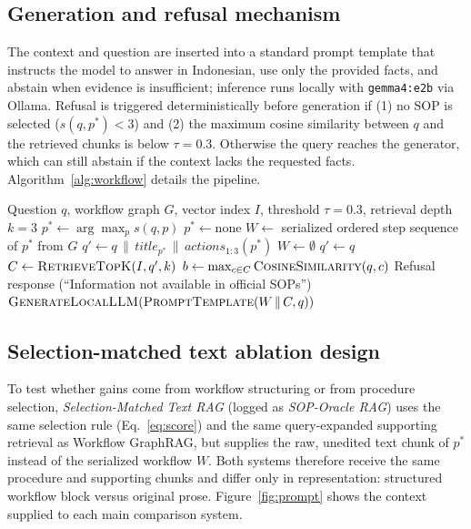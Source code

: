 \documentclass[preprint,10pt]{elsarticle}
\begin{document}
\subsection{Generation and refusal mechanism}
The context and question are inserted into a standard prompt template that instructs the model to answer in Indonesian, use only the provided facts, and abstain when evidence is insufficient; inference runs locally with \texttt{gemma4:e2b} via Ollama. Refusal is triggered deterministically before generation if (1) no SOP is selected ($s(q,p^\ast)<3$) and (2) the maximum cosine similarity between $q$ and the retrieved chunks is below $\tau=0.3$. Otherwise the query reaches the generator, which can still abstain if the context lacks the requested facts. Algorithm~\ref{alg:workflow} details the pipeline.

\begin{algorithm}[!htbp]
\caption{Execution pipeline of Process-Aware Workflow GraphRAG}
\label{alg:workflow}
\begin{algorithmic}[1]
\REQUIRE Question $q$, workflow graph $G$, vector index $I$, threshold $\tau = 0.3$, retrieval depth $k=3$
\STATE $p^\ast \leftarrow \arg\max_p s(q,p)$ 
  \STATE $p^\ast \leftarrow \text{none}$
\ENDIF
{}
  \STATE $W \leftarrow$ serialized ordered step sequence of $p^\ast$ from $G$
  \STATE $q' \leftarrow q \,\|\, \textit{title}_{p^\ast} \,\|\, \textit{actions}_{1:3}(p^\ast)$ 
\ELSE
  \STATE $W \leftarrow \emptyset$
  \STATE $q' \leftarrow q$ 
\ENDIF
\STATE $C \leftarrow \textsc{RetrieveTopK}(I, q', k)$
\STATE $b \leftarrow \max_{c \in C} \textsc{CosineSimilarity}(q, c)$
  \RETURN Refusal response (``Information not available in official SOPs'')
\ENDIF
\RETURN $\textsc{GenerateLocalLLM}(\textsc{PromptTemplate}(W \,\|\, C, q))$
\end{algorithmic}
\end{algorithm}

\subsection{Selection-matched text ablation design}
\label{sec:ablation-oracle}
To test whether gains come from workflow structuring or from procedure selection, \emph{Selection-Matched Text RAG} (logged as \emph{SOP-Oracle RAG}) uses the same selection rule (Eq.~\eqref{eq:score}) and the same query-expanded supporting retrieval as Workflow GraphRAG, but supplies the raw, unedited text chunk of $p^\ast$ instead of the serialized workflow $W$. Both systems therefore receive the same procedure and supporting chunks and differ only in representation: structured workflow block versus original prose. Figure~\ref{fig:prompt} shows the context supplied to each main comparison system.
\end{document}
